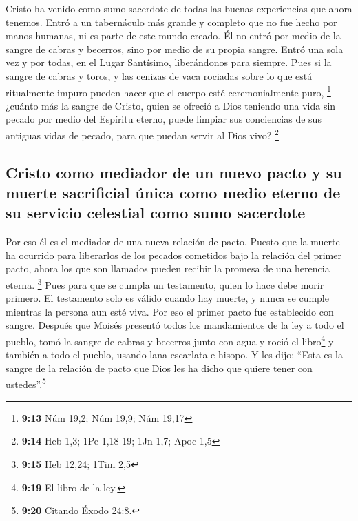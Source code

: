  Cristo ha venido como sumo sacerdote de todas las buenas
experiencias que ahora tenemos. Entró a un tabernáculo más grande y
completo que no fue hecho por manos humanas, ni es parte de este mundo
creado.  Él no entró por medio de la sangre de cabras y
becerros, sino por medio de su propia sangre. Entró una sola vez y por
todas, en el Lugar Santísimo, liberándonos para siempre. 
Pues si la sangre de cabras y toros, y las cenizas de vaca rociadas
sobre lo que está ritualmente impuro pueden hacer que el cuerpo esté
ceremonialmente puro, \footnote{\textbf{9:13} Núm 19,2; Núm 19,9; Núm
  19,17}  ¿cuánto más la sangre de Cristo, quien se
ofreció a Dios teniendo una vida sin pecado por medio del Espíritu
eterno, puede limpiar sus conciencias de sus antiguas vidas de pecado,
para que puedan servir al Dios vivo? \footnote{\textbf{9:14} Heb 1,3;
  1Pe 1,18-19; 1Jn 1,7; Apoc 1,5}

\hypertarget{cristo-como-mediador-de-un-nuevo-pacto-y-su-muerte-sacrificial-uxfanica-como-medio-eterno-de-su-servicio-celestial-como-sumo-sacerdote}{%
\subsection{Cristo como mediador de un nuevo pacto y su muerte
sacrificial única como medio eterno de su servicio celestial como sumo
sacerdote}\label{cristo-como-mediador-de-un-nuevo-pacto-y-su-muerte-sacrificial-uxfanica-como-medio-eterno-de-su-servicio-celestial-como-sumo-sacerdote}}

 Por eso él es el mediador de una nueva relación de
pacto. Puesto que la muerte ha ocurrido para liberarlos de los pecados
cometidos bajo la relación del primer pacto, ahora los que son llamados
pueden recibir la promesa de una herencia eterna. \footnote{\textbf{9:15}
  Heb 12,24; 1Tim 2,5}  Pues para que se cumpla un
testamento, quien lo hace debe morir primero.  El
testamento solo es válido cuando hay muerte, y nunca se cumple mientras
la persona aun esté viva.  Por eso el primer pacto fue
establecido con sangre.  Después que Moisés presentó
todos los mandamientos de la ley a todo el pueblo, tomó la sangre de
cabras y becerros junto con agua y roció el libro\footnote{\textbf{9:19}
  El libro de la ley.} y también a todo el pueblo, usando lana escarlata
e hisopo.  Y les dijo: ``Esta es la sangre de la relación
de pacto que Dios les ha dicho que quiere tener con
ustedes''.\footnote{\textbf{9:20} Citando Éxodo 24:8.}

